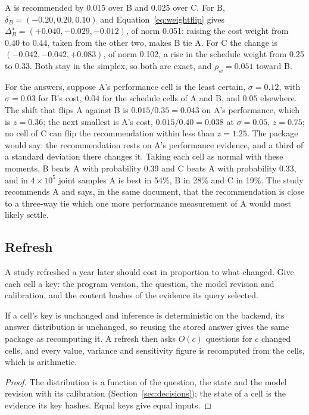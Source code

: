 A is recommended by 0.015 over B and 0.025 over C. For B,
$\delta_B = (-0.20, 0.20, 0.10)$ and Equation~\eqref{eq:weightflip} gives
$\Delta^\star_B = (+0.040, -0.029, -0.012)$, of norm 0.051: raising the cost
weight from 0.40 to 0.44, taken from the other two, makes B tie A. For C the
change is $(-0.042, -0.042, +0.083)$, of norm 0.102, a rise in the schedule
weight from 0.25 to 0.33. Both stay in the simplex, so both are exact, and
$\rho_w = 0.051$ toward B.

For the answers, suppose A's performance cell is the least certain,
$\sigma = 0.12$, with $\sigma = 0.03$ for B's cost, $0.04$ for the schedule
cells of A and B, and $0.05$ elsewhere. The shift that flips A against B is
$0.015/0.35 = 0.043$ on A's performance, which is $z = 0.36$; the next
smallest is A's cost, $0.015/0.40 = 0.038$ at $\sigma = 0.05$, $z = 0.75$;
no cell of C can flip the recommendation within less than $z = 1.25$. The
package would say: the recommendation rests on A's performance evidence, and a
third of a standard deviation there changes it. Taking each cell as normal
with these moments, B beats A with probability 0.39 and C beats A with
probability 0.33, and in $4 \times 10^5$ joint samples A is best in 54\%, B in
28\% and C in 19\%. The study recommends A and says, in the same document,
that the recommendation is close to a three-way tie which one more performance
measurement of A would most likely settle.

\subsection{Refresh}

A study refreshed a year later should cost in proportion to what changed. Give
each cell a key: the program version, the question, the model revision and
calibration, and the content hashes of the evidence its query selected.

\begin{proposition}
\label{prop:refresh}
If a cell's key is unchanged and inference is deterministic on the backend,
its answer distribution is unchanged, so reusing the stored answer gives the
same package as recomputing it. A refresh then asks $O(c)$ questions for $c$
changed cells, and every value, variance and sensitivity figure is recomputed
from the cells, which is arithmetic.
\end{proposition}
\begin{proof}
The distribution is a function of the question, the state and the model
revision with its calibration (Section~\ref{sec:decisions}); the state of a
cell is the evidence its key hashes. Equal keys give equal inputs.
\end{proof}

